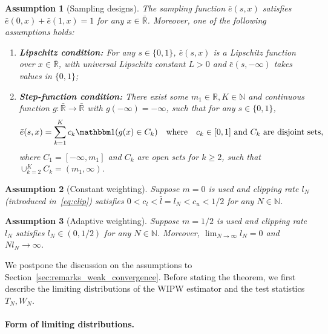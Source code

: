 \documentclass[12pt]{article}
\newtheorem{assumption}{Assumption}
\newcommand{\indicator}{\mathbbm 1}						%
\begin{document}
\begin{assumption}[Sampling designs]\label{assu:sampling_design}
	The sampling function $\bar e(s,x)$ satisfies $\bar e(0,x)+\bar e(1,x)=1$ for any $x\in\bar{\mathbb{R}}$. Moreover, one of the following assumptions holds:
	\begin{enumerate}
		\item\textbf{Lipschitz condition:} For any $s\in\{0,1\}$, $\bar e(s,x)$ is a Lipschitz function over $x\in\bar{\mathbb{R}}$, with universal Lipschitz constant $L>0$ and $\bar e(s,-\infty)$ takes values in $\{0,1\}$;
		\item\textbf{Step-function condition:} There exist some $m_1\in\mathbb{R},K\in\mathbb{N}$ and continuous function $g:\bar{\mathbb{R}}\rightarrow\bar{\mathbb{R}}$ with $g(-\infty)=-\infty$, such that for any $s\in\{0,1\}$, 
		\begin{align*}
			\bar e(s,x)=\sum_{k=1}^K c_{k}\indicator(g(x)\in C_k)\quad\text{where}\quad c_k\in [0,1]\text{ and $C_k$ are disjoint sets},
		\end{align*}
		where $C_1=[-\infty, m_1]$ and $C_k$ are open sets for $k\geq 2$, such that $\cup_{k=2}^{K}C_k=(m_1,\infty)$.
 	\end{enumerate}
\end{assumption}

\begin{assumption}[Constant weighting]\label{assu:constant_weighting}
	Suppose $m=0$ is used and clipping rate $l_N$ (introduced in~\eqref{eq:clip}) satisfies $0<c_l<\bar l=l_N<c_u<1/2$ for any $N\in\mathbb{N}$.
\end{assumption}

\begin{assumption}[Adaptive weighting]\label{assu:adaptive_weighting}
	Suppose $m=1/2$ is used and clipping rate $l_N$ satisfies $l_N\in (0,1/2)$ for any $N\in\mathbb{N}$. Moreover, $\lim_{N\rightarrow\infty}l_N=0$ and $Nl_N\rightarrow\infty$.
\end{assumption}

We postpone the discussion on the assumptions to Section~\ref{sec:remarks_weak_convergence}. Before stating the theorem, we first describe the limiting distributions of the WIPW estimator and the test statistics $T_N,W_N$. 

\paragraph{Form of limiting distributions.}
\end{document}
